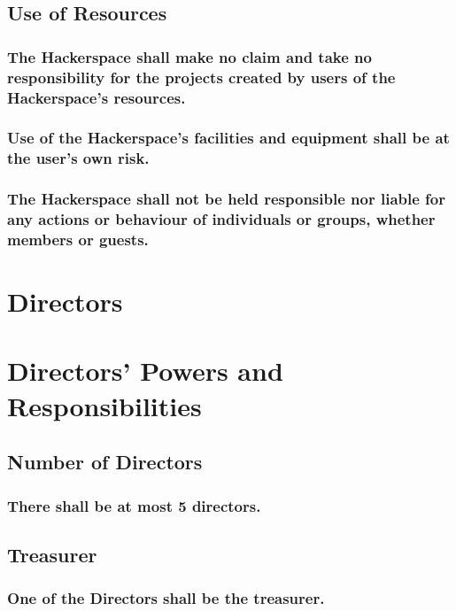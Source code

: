 \documentclass[12pt]{article}
\begin{document}
\subsection{Use of Resources}
\subsubsection[The Hackerspace is Not Responsible]{The Hackerspace shall make no claim and take no responsibility for the projects created by users of the Hackerspace's resources.}
\subsubsection[Use of Resources is at User's Own Risk]{Use of the Hackerspace's facilities and equipment shall be at the user's own risk.}
\subsubsection[The Hackerspace is Not Liable]{The Hackerspace shall not be held responsible nor liable for any actions or behaviour of individuals or groups, whether members or guests.}

\newpage\section*{\huge{Directors}}
\section*{Directors' Powers and Responsibilities}

\subsection{Number of Directors}
\subsubsection[Limit to Number of Directors]{There shall be at most 5 directors.}\label{subsubsection:numdirectors}

\subsection{Treasurer}
\subsubsection{One of the Directors shall be the treasurer.}
\end{document}
